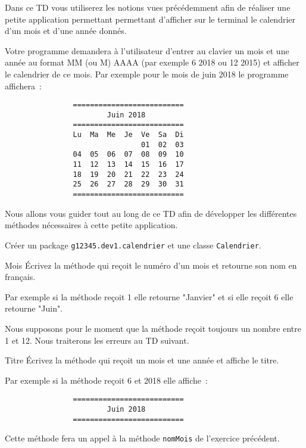 \documentclass[a4paper,11pt]{article}
\date{2018 -- 2019}
\begin{document}
\entete
\titre
{}
\lastedit


	Dans ce TD vous utiliserez les notions vues précédemment afin de réaliser 
	une petite application permettant permettant d'afficher sur le terminal 
	le calendrier d'un mois et d'une année donnés. 
	
	Votre programme demandera à l'utilisateur d'entrer au clavier un mois et une année 
au format MM (ou M) AAAA (par exemple 6 2018 ou 12 2015) et afficher le calendrier de ce mois.
Par exemple pour le mois de juin 2018 le programme affichera~: 

\begin{verbatim}
                ==========================
                        Juin 2018
                ========================== 
                Lu  Ma  Me  Je  Ve  Sa  Di
                                01  02  03   
                04  05  06  07  08  09  10   
                11  12  13  14  15  16  17   
                18  19  20  21  22  23  24   
                25  26  27  28  29  30  31      
                ==========================
\end{verbatim}

\vspace{0.5cm}


Nous allons vous guider tout au long de ce TD afin de développer les différentes méthodes nécessaires à cette petite application.


		Créer un package \texttt{g12345.dev1.calendrier} et une classe \texttt{Calendrier}.


 	\begin{Exercice}{Mois}
		\'Ecrivez la méthode  qui reçoit le numéro d'un mois et retourne son nom en français.
		
		Par exemple si la méthode reçoit 1 elle retourne "Janvier" et si elle reçoit 6 elle retourne "Juin".
		
		Nous supposons pour le moment que la méthode reçoit toujours un nombre entre 1 et 12.
		Nous traiterons les erreurs au TD suivant.
	\end{Exercice} 

 
 	\begin{Exercice}{Titre}
		\'Ecrivez la méthode  qui reçoit un mois et une année
		et affiche le titre. 
		
		Par exemple si la méthode reçoit 6 et 2018 elle affiche~:
		\begin{verbatim}
                ==========================
                        Juin 2018
                ========================== 
		\end{verbatim}	
		
		Cette méthode fera un appel à la méthode \texttt{nomMois} de l'exercice précédent.
	\end{Exercice} 
\end{document}
